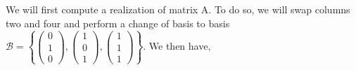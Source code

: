 \vspace{5pt}

We will first compute a realization of matrix A.
To do so, we will swap columns two and four and perform a change of basis to basis $\mathcal{B} = \left\lbrace \left( \begin{array}{c} 0 \\ 1 \\ 0 \end{array} \right), \left( \begin{array}{c} 1 \\ 0 \\ 1 \end{array} \right), \left( \begin{array}{c} 1 \\ 1 \\ 1 \end{array} \right) \right\rbrace$. We then have,
